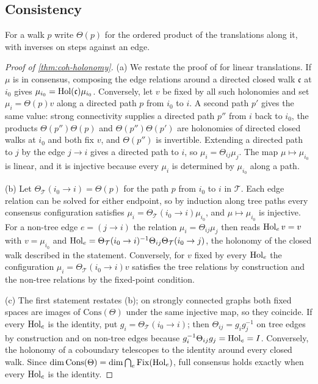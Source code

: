 \subsection{Consistency}\label{app:coh-consistency}

For a walk $p$ write $\Theta(p)$ for the ordered product of the translations along it, with inverses on steps against an edge.

\begin{proof}[Proof of \cref{thm:coh-holonomy}]
(a) We restate the proof of \citet{dennis2026magent} for linear translations. If $\mu$ is in consensus, composing the edge relations around a directed closed walk $\mathfrak c$ at $i_0$ gives $\mu_{i_0}=\operatorname{Hol}(\mathfrak c)\mu_{i_0}$. Conversely, let $v$ be fixed by all such holonomies and set $\mu_i=\Theta(p)v$ along a directed path $p$ from $i_0$ to $i$. A second path $p'$ gives the same value: strong connectivity supplies a directed path $p''$ from $i$ back to $i_0$, the products $\Theta(p'')\Theta(p)$ and $\Theta(p'')\Theta(p')$ are holonomies of directed closed walks at $i_0$ and both fix $v$, and $\Theta(p'')$ is invertible. Extending a directed path to $j$ by the edge $j\to i$ gives a directed path to $i$, so $\mu_i=\Theta_{ij}\mu_j$. The map $\mu\mapsto\mu_{i_0}$ is linear, and it is injective because every $\mu_i$ is determined by $\mu_{i_0}$ along a path.

(b) Let $\Theta_{\mathcal T}(i_0\to i)=\Theta(p)$ for the path $p$ from $i_0$ to $i$ in $\mathcal T$. Each edge relation can be solved for either endpoint, so by induction along tree paths every consensus configuration satisfies $\mu_i=\Theta_{\mathcal T}(i_0\to i)\mu_{i_0}$, and $\mu\mapsto\mu_{i_0}$ is injective. For a non-tree edge $e=(j\to i)$ the relation $\mu_i=\Theta_{ij}\mu_j$ then reads $\operatorname{Hol}_ev=v$ with $v=\mu_{i_0}$ and $\operatorname{Hol}_e=\Theta_{\mathcal T}(i_0\to i)^{-1}\Theta_{ij}\Theta_{\mathcal T}(i_0\to j)$, the holonomy of the closed walk described in the statement. Conversely, for $v$ fixed by every $\operatorname{Hol}_e$ the configuration $\mu_i=\Theta_{\mathcal T}(i_0\to i)v$ satisfies the tree relations by construction and the non-tree relations by the fixed-point condition.

(c) The first statement restates (b); on strongly connected graphs both fixed spaces are images of $\mathrm{Cons}(\Theta)$ under the same injective map, so they coincide. If every $\operatorname{Hol}_e$ is the identity, put $g_i=\Theta_{\mathcal T}(i_0\to i)$; then $\Theta_{ij}=g_ig_j^{-1}$ on tree edges by construction and on non-tree edges because $g_i^{-1}\Theta_{ij}g_j=\operatorname{Hol}_e=I$. Conversely, the holonomy of a coboundary telescopes to the identity around every closed walk. Since $\dim\mathrm{Cons}(\Theta)=\dim\bigcap_e\mathrm{Fix}(\operatorname{Hol}_e)$, full consensus holds exactly when every $\operatorname{Hol}_e$ is the identity.
\end{proof}

